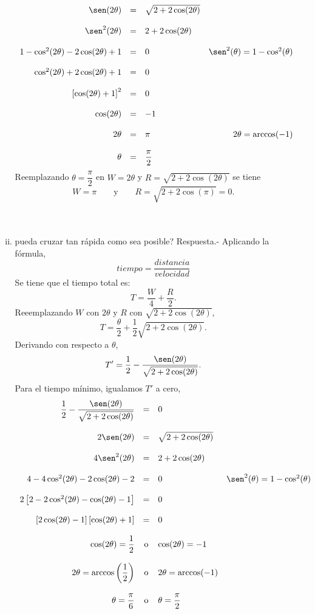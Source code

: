 \begin{enumerate}[\bfseries 1.]
\begin{enumerate}[(i)]
$$\begin{array}{rclr}
		    \sen(2\theta)&=&\sqrt{2+2\cos(2\theta)}&\\\\
		    \sen^2(2\theta)&=&2+2\cos(2\theta)&\\\\
			1-\cos^2(2\theta)-2\cos(2\theta)+1&=&0&\sen^2(\theta)=1-\cos^2(\theta)\\\\
							  \cos^2(2\theta)+2\cos(2\theta)+1&=&0&\\\\
							  \left[\cos(2\theta)+1\right]^2&=&0&\\\\
							  \cos(2\theta)&=&-1&\\\\
							  2\theta&=&\pi&2\theta=\arccos(-1)\\\\
							  \theta&=&\dfrac{\pi}{2}&
		\end{array}$$
		Reemplazando $\theta=\dfrac{\pi}{2}$ en $W=2\theta$ y $R=\sqrt{2+2\cos(2\theta)}$ se tiene
		$$W=\pi \qquad \mbox{y}\qquad R=\sqrt{2+2\cos(\pi)}=0.$$\\\\

	    \item pueda cruzar tan rápida como sea posible?
		Respuesta.-\; Aplicando la fórmula,
		$$tiempo=\dfrac{distancia}{velocidad}$$
		Se tiene que el tiempo total es:
		$$T=\dfrac{W}{4}+\dfrac{R}{2}.$$
		Reeemplazando $W$ con $2\theta$ y $R$ con $\sqrt{2+2\cos(2\theta)}$,
		$$T=\dfrac{\theta}{2}+\dfrac{1}{2}\sqrt{2+2\cos(2\theta)}.$$
		Derivando con respecto a $\theta$,
		$$T'=\dfrac{1}{2}-\dfrac{\sen(2\theta)}{\sqrt{2+2\cos(2\theta)}}.$$
		Para el tiempo mínimo, igualamos $T'$ a cero,
		$$\begin{array}{rclr}
		    \dfrac{1}{2}-\dfrac{\sen(2\theta)}{\sqrt{2+2\cos(2\theta)}}&=&0&\\\\
		    2\sen(2\theta)&=&\sqrt{2+2\cos(2\theta)}&\\\\
		    4\sen^2(2\theta)&=&2+2\cos(2\theta)&\\\\
		    4-4\cos^2(2\theta)-2\cos(2\theta)-2&=&0&\sen^2(\theta)=1-\cos^2(\theta)\\\\
		    2\left[2-2\cos^2(2\theta)-\cos(2\theta)-1\right]&=&0\\\\
		    \left[2\cos(2\theta)-1\right]\left[\cos(2\theta)+1\right]&=&0&\\\\
		    \cos(2\theta)=\dfrac{1}{2}&\mbox{o}&\cos(2\theta)=-1&\\\\
		    2\theta=\arccos\left(\dfrac{1}{2}\right)&\mbox{o}&2\theta=\arccos(-1)&\\\\
		    \theta=\dfrac{\pi}{6}&\mbox{o}&\theta=\dfrac{\pi}{2}&
		\end{array}$$


\end{enumerate}
\end{enumerate}
